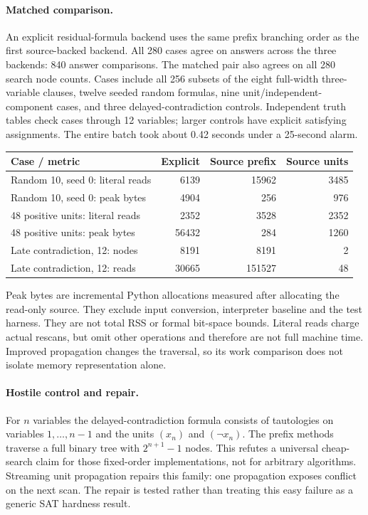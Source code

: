\documentclass[11pt]{article}
\begin{document}
\paragraph{Matched comparison.}
An explicit residual-formula backend uses the same prefix branching order as the
first source-backed backend. All 280 cases agree on answers across the three
backends: 840 answer comparisons. The matched pair also agrees on all 280 search
node counts. Cases include all 256 subsets of the eight full-width three-variable
clauses, twelve seeded random formulas, nine unit/independent-component cases,
and three delayed-contradiction controls. Independent truth tables check cases
through 12 variables; larger controls have explicit satisfying assignments.
The entire batch took about 0.42 seconds under a 25-second alarm.

\begin{center}
\begin{tabular}{lrrr}
\toprule
Case / metric & Explicit & Source prefix & Source units\\
\midrule
Random 10, seed 0: literal reads & 6139 & 15962 & 3485\\
Random 10, seed 0: peak bytes & 4904 & 256 & 976\\
48 positive units: literal reads & 2352 & 3528 & 2352\\
48 positive units: peak bytes & 56432 & 284 & 1260\\
Late contradiction, 12: nodes & 8191 & 8191 & 2\\
Late contradiction, 12: reads & 30665 & 151527 & 48\\
\bottomrule
\end{tabular}
\end{center}
Peak bytes are incremental Python allocations measured after allocating the
read-only source. They exclude input conversion, interpreter baseline and the
test harness. They are not total RSS or formal bit-space bounds. Literal reads
charge actual rescans, but omit other operations and therefore are not full
machine time. Improved propagation changes the traversal, so its work comparison
does not isolate memory representation alone.

\paragraph{Hostile control and repair.}
For $n$ variables the delayed-contradiction formula consists of tautologies on
variables $1,\ldots,n-1$ and the units $(x_n)$ and $(\neg x_n)$.
The prefix methods traverse a full binary tree with $2^{n+1}-1$ nodes.
This refutes a universal cheap-search claim for those fixed-order implementations,
not for arbitrary algorithms. Streaming unit propagation repairs this family:
one propagation exposes conflict on the next scan. The repair is tested rather
than treating this easy failure as a generic SAT hardness result.
\end{document}
